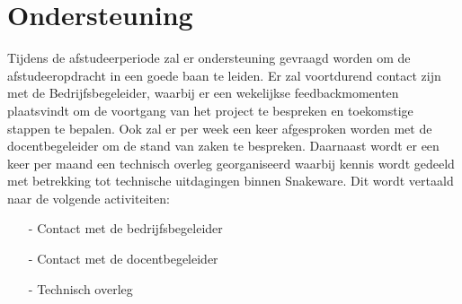 \section{Ondersteuning}
Tijdens de afstudeerperiode zal er ondersteuning gevraagd worden om de afstudeeropdracht in een goede baan te leiden.
Er zal voortdurend contact zijn met de Bedrijfsbegeleider, waarbij er een wekelijkse feedbackmomenten plaatsvindt om de voortgang van het project te bespreken en toekomstige stappen te bepalen.
Ook zal er per week een keer afgesproken worden met de docentbegeleider om de stand van zaken te bespreken.
Daarnaast wordt er een keer per maand een technisch overleg georganiseerd waarbij kennis wordt gedeeld met betrekking tot technische uitdagingen binnen Snakeware.
Dit wordt vertaald naar de volgende activiteiten:

\whitespace
\begin{itemize}
	\item[-] Contact met de bedrijfsbegeleider
	\item[-] Contact met de docentbegeleider
	\item[-] Technisch overleg
\end{itemize}
